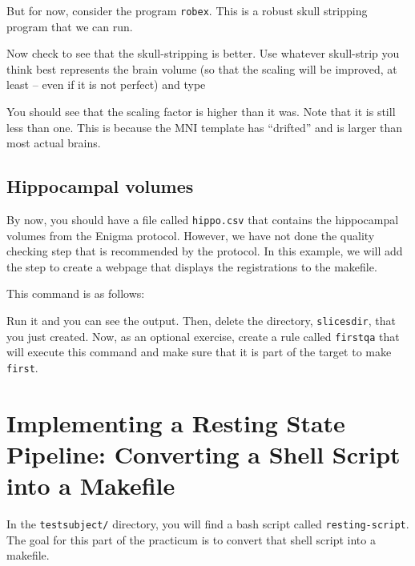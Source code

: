 But for now, consider the program \texttt{robex}. This is a robust
skull stripping program \citep{Iglesias2011} that we can run.

Now check to see that the skull-stripping is better. Use whatever skull-strip you think best represents the brain volume (so that the scaling will be improved, at least -- even if it is not perfect) and type 

You should see that the scaling factor is higher than it
was. Note that it is still less than one. This is because the MNI
template has ``drifted'' and is larger than most actual brains. 

\subsection{Hippocampal volumes}
By now, you should have a file called \texttt{hippo.csv} that contains the hippocampal volumes from the Enigma protocol. However, we have not done the quality checking step that is recommended by the protocol. In this example, we will add the step to create a webpage that displays the registrations to the makefile.

This command is as follows:

Run it and you can see the output. Then, delete the directory, \texttt{slicesdir}, that you just created. Now, as an optional exercise, create a rule called \texttt{firstqa} that will execute this command and make sure that it is part of the target to make \texttt{first}.

\section{Implementing a Resting State Pipeline: Converting a Shell Script into a Makefile}

In the \texttt{testsubject/} directory, you will find a bash script called \texttt{resting-script}. The goal for this part of the practicum is to convert that shell script into a makefile. 

